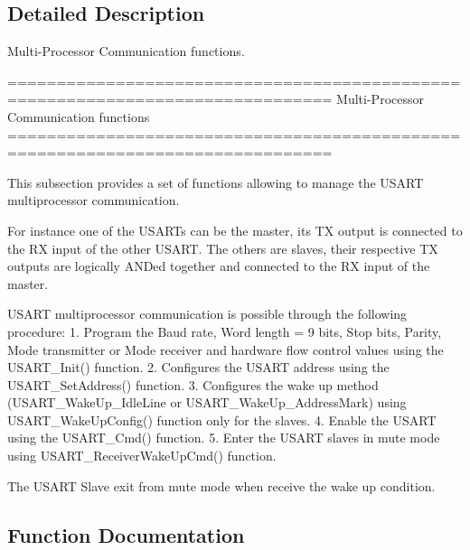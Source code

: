 \subsection{Detailed Description}
Multi-\/\+Processor Communication functions. 

\begin{DoxyVerb} ===============================================================================
                    Multi-Processor Communication functions
 ===============================================================================  

  This subsection provides a set of functions allowing to manage the USART 
  multiprocessor communication.
  
  For instance one of the USARTs can be the master, its TX output is connected to 
  the RX input of the other USART. The others are slaves, their respective TX outputs 
  are logically ANDed together and connected to the RX input of the master.

  USART multiprocessor communication is possible through the following procedure:
     1. Program the Baud rate, Word length = 9 bits, Stop bits, Parity, Mode transmitter 
        or Mode receiver and hardware flow control values using the USART_Init()
        function.
     2. Configures the USART address using the USART_SetAddress() function.
     3. Configures the wake up method (USART_WakeUp_IdleLine or USART_WakeUp_AddressMark)
        using USART_WakeUpConfig() function only for the slaves.
     4. Enable the USART using the USART_Cmd() function.
     5. Enter the USART slaves in mute mode using USART_ReceiverWakeUpCmd() function.

  The USART Slave exit from mute mode when receive the wake up condition.\end{DoxyVerb}
 

\subsection{Function Documentation}
\mbox{\label{group___u_s_a_r_t___group3_gac27b78ce445a16fe33851d2f87781c02}} 
